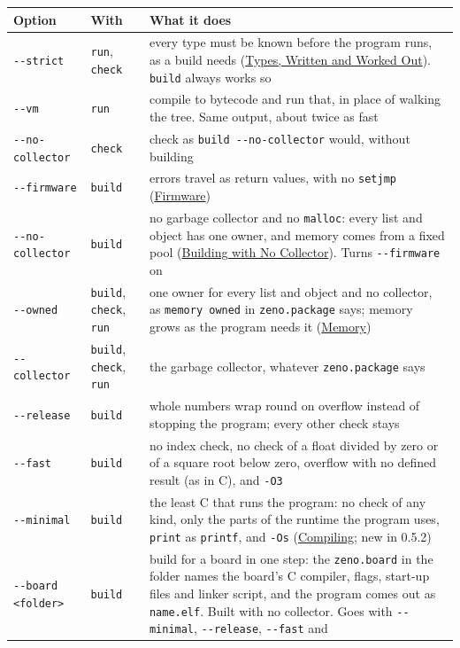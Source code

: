 \begin{longtable}{llP{6.6cm}}
\toprule
Option & With & What it does \\
\midrule
\endhead
\verb|--strict| & \verb|run|, \verb|check| & every type must be known
  before the program runs, as a build needs
  (\hyperref[ch-types]{Types, Written and Worked Out}). \verb|build| always works so \\
\verb|--vm| & \verb|run| & compile to bytecode and run that, in place of
  walking the tree. Same output, about twice as fast \\
\verb|--no-collector| & \verb|check| & check as
  \verb|build --no-collector| would, without building \\
\verb|--firmware| & \verb|build| & errors travel as return values, with
  no \verb|setjmp| (\hyperref[ch-firmware]{Firmware}) \\
\verb|--no-collector| & \verb|build| & no garbage collector and no
  \verb|malloc|: every list and object has one owner, and memory comes
  from a fixed pool (\hyperref[ch-no-collector]{Building with No
  Collector}). Turns \verb|--firmware| on \\
\verb|--owned| & \verb|build|, \verb|check|, \verb|run| & one owner for
  every list and object and no collector, as \verb|memory owned| in
  \verb|zeno.package| says; memory grows as the program needs it
  (\hyperref[ch-memory]{Memory}) \\
\verb|--collector| & \verb|build|, \verb|check|, \verb|run| & the garbage
  collector, whatever \verb|zeno.package| says \\
\verb|--release| & \verb|build| & whole numbers wrap round on overflow
  instead of stopping the program; every other check stays \\
\verb|--fast| & \verb|build| & no index check, no check of a float
  divided by zero or of a square root below zero, overflow with no
  defined result (as in C), and \verb|-O3| \\
\verb|--minimal| & \verb|build| & the least C that runs the program:
  no check of any kind, only the parts of the runtime the program
  uses, \verb|print| as \verb|printf|, and \verb|-Os|
  (\hyperref[ch-compiling]{Compiling}; new in 0.5.2) \\
\verb|--board <folder>| & \verb|build| & build for a board in one
  step: the \verb|zeno.board| in the folder names the board's C
  compiler, flags, start-up files and linker script, and the program
  comes out as \verb|name.elf|. Built with no collector. Goes with
  \verb|--minimal|, \verb|--release|, \verb|--fast| and

\end{longtable}
